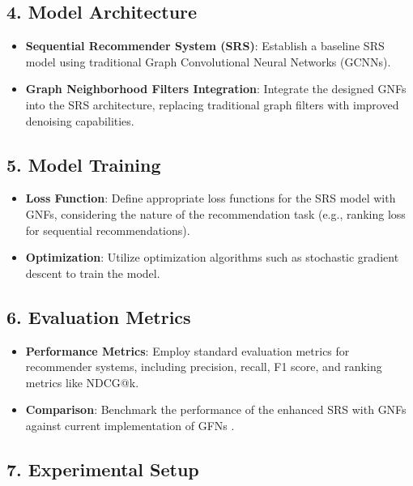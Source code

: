 \documentclass[journal]{IEEEtran}
\begin{document}
\subsection*{4. Model Architecture}

\begin{itemize}
  \item \textbf{Sequential Recommender System (SRS)}: Establish a baseline SRS model using traditional Graph Convolutional Neural Networks (GCNNs).
  \item \textbf{Graph Neighborhood Filters Integration}: Integrate the designed GNFs into the SRS architecture, replacing traditional graph filters with improved denoising capabilities.
\end{itemize}

\subsection*{5. Model Training}

\begin{itemize}
  \item \textbf{Loss Function}: Define appropriate loss functions for the SRS model with GNFs, considering the nature of the recommendation task (e.g., ranking loss for sequential recommendations).
  \item \textbf{Optimization}: Utilize optimization algorithms such as stochastic gradient descent to train the model.
\end{itemize}

\subsection*{6. Evaluation Metrics}

\begin{itemize}
  \item \textbf{Performance Metrics}: Employ standard evaluation metrics for recommender systems, including precision, recall, F1 score, and ranking metrics like NDCG@k.
  \item \textbf{Comparison}: Benchmark the performance of the enhanced SRS with GNFs against current implementation of GFNs \cite{tenorio2021robust}.
\end{itemize}

\subsection*{7. Experimental Setup}
\end{document}
